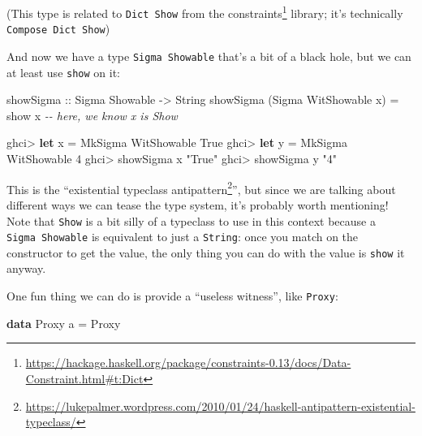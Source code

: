 \documentclass[]{article}
\newenvironment{Shaded}{}{}
\newcommand{\CommentTok}[1]{\textcolor[rgb]{0.38,0.63,0.69}{\textit{#1}}}
\newcommand{\DataTypeTok}[1]{\textcolor[rgb]{0.56,0.13,0.00}{#1}}
\newcommand{\DecValTok}[1]{\textcolor[rgb]{0.25,0.63,0.44}{#1}}
\newcommand{\FunctionTok}[1]{\textcolor[rgb]{0.02,0.16,0.49}{#1}}
\newcommand{\KeywordTok}[1]{\textcolor[rgb]{0.00,0.44,0.13}{\textbf{#1}}}
\newcommand{\NormalTok}[1]{#1}
\newcommand{\OperatorTok}[1]{\textcolor[rgb]{0.40,0.40,0.40}{#1}}
\newcommand{\OtherTok}[1]{\textcolor[rgb]{0.00,0.44,0.13}{#1}}
\newcommand{\StringTok}[1]{\textcolor[rgb]{0.25,0.44,0.63}{#1}}
\renewcommand{\href}[2]{#2\footnote{\url{#1}}}
\begin{document}
(This type is related to \texttt{Dict\ Show} from the
\href{https://hackage.haskell.org/package/constraints-0.13/docs/Data-Constraint.html\#t:Dict}{constraints}
library; it's technically \texttt{Compose\ Dict\ Show})

And now we have a type \texttt{Sigma\ Showable} that's a bit of a black hole,
but we can at least use \texttt{show} on it:

\begin{Shaded}
\begin{Highlighting}[]
\OtherTok{showSigma ::} \DataTypeTok{Sigma} \DataTypeTok{Showable} \OtherTok{{-}\textgreater{}} \DataTypeTok{String}
\NormalTok{showSigma (}\DataTypeTok{Sigma} \DataTypeTok{WitShowable}\NormalTok{ x) }\OtherTok{=} \FunctionTok{show}\NormalTok{ x       }\CommentTok{{-}{-} here, we know x is Show}
\end{Highlighting}
\end{Shaded}

\begin{Shaded}
\begin{Highlighting}[]
\NormalTok{ghci}\OperatorTok{\textgreater{}} \KeywordTok{let}\NormalTok{ x }\OtherTok{=} \DataTypeTok{MkSigma} \DataTypeTok{WitShowable} \DataTypeTok{True}
\NormalTok{ghci}\OperatorTok{\textgreater{}} \KeywordTok{let}\NormalTok{ y }\OtherTok{=} \DataTypeTok{MkSigma} \DataTypeTok{WitShowable} \DecValTok{4}
\NormalTok{ghci}\OperatorTok{\textgreater{}}\NormalTok{ showSigma x}
\StringTok{"True"}
\NormalTok{ghci}\OperatorTok{\textgreater{}}\NormalTok{ showSigma y}
\StringTok{"4"}
\end{Highlighting}
\end{Shaded}

This is the
``\href{https://lukepalmer.wordpress.com/2010/01/24/haskell-antipattern-existential-typeclass/}{existential
typeclass antipattern}'', but since we are talking about different ways we can
tease the type system, it's probably worth mentioning! Note that \texttt{Show}
is a bit silly of a typeclass to use in this context because a
\texttt{Sigma\ Showable} is equivalent to just a \texttt{String}: once you match
on the constructor to get the value, the only thing you can do with the value is
\texttt{show} it anyway.

One fun thing we can do is provide a ``useless witness'', like \texttt{Proxy}:

\begin{Shaded}
\begin{Highlighting}[]
\KeywordTok{data} \DataTypeTok{Proxy}\NormalTok{ a }\OtherTok{=} \DataTypeTok{Proxy}
\end{Highlighting}
\end{Shaded}
\end{document}
